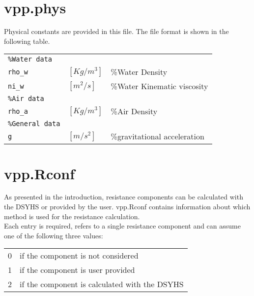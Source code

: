 \documentclass[a4paper,openany]{memoir}
\begin{document}
\section{vpp.phys}
Physical constants are provided in this file. The file format is shown in the following table.
\begin{center}
  \begin{tabular}{lll}
    \texttt{\%Water data}\\
    \texttt{rho\_w} 	&${[Kg/m^3]}$ 	&\%Water Density\\
    \texttt{ni\_w}		&${[m^2/s]}$	&\%Water Kinematic viscosity\\
    \texttt{\%Air data}\\
    \texttt{rho\_a}   	&${[Kg/m^3]}$	&\%Air Density\\
    \texttt{\%General data}\\
    \texttt{g}		&${[m/s^2]}$	&\%gravitational acceleration\\
  \end{tabular}
\end{center}


\section{vpp.Rconf}

As presented in the introduction, resistance components can be calculated with the DSYHS or provided by the user. vpp.Rconf contains information about which method is used for the resistance calculation.	\\
Each entry is required, refers to a single resistance component and can assume one of the following three values:
\begin{center}
  \begin{tabular}{l l}
    0	& if the component is not considered\\
    1  	& if the component is user provided\\
    2	& if the component is calculated with the DSYHS\\
  \end{tabular}
\end{center}
\end{document}
